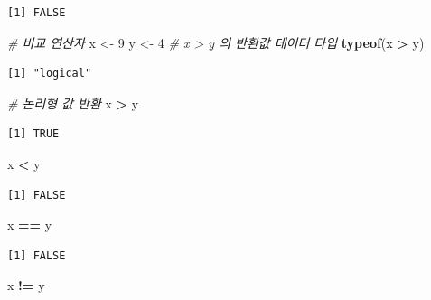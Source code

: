 \documentclass[
  11pt,
]{krantz}
\newenvironment{Shaded}{\begin{snugshade}}{\end{snugshade}}
\newcommand{\CommentTok}[1]{\textcolor[rgb]{0.37,0.37,0.37}{\textit{#1}}}
\newcommand{\DecValTok}[1]{\textcolor[rgb]{0.06,0.06,0.06}{#1}}
\newcommand{\KeywordTok}[1]{\textcolor[rgb]{0.27,0.27,0.27}{\textbf{#1}}}
\newcommand{\NormalTok}[1]{#1}
\newcommand{\OperatorTok}[1]{\textcolor[rgb]{0.43,0.43,0.43}{\textbf{#1}}}
\newcommand{\StringTok}[1]{\textcolor[rgb]{0.5,0.5,0.5}{#1}}
\begin{document}
\begin{verbatim}
[1] FALSE
\end{verbatim}

\begin{Shaded}
\begin{Highlighting}[]
\CommentTok{# 비교 연산자}
\NormalTok{x <-}\StringTok{ }\DecValTok{9}
\NormalTok{y <-}\StringTok{ }\DecValTok{4}
\CommentTok{# x > y 의 반환값 데이터 타입}
\KeywordTok{typeof}\NormalTok{(x }\OperatorTok{>}\StringTok{ }\NormalTok{y)}
\end{Highlighting}
\end{Shaded}

\begin{verbatim}
[1] "logical"
\end{verbatim}

\begin{Shaded}
\begin{Highlighting}[]
\CommentTok{# 논리형 값 반환}
\NormalTok{x }\OperatorTok{>}\StringTok{ }\NormalTok{y}
\end{Highlighting}
\end{Shaded}

\begin{verbatim}
[1] TRUE
\end{verbatim}

\begin{Shaded}
\begin{Highlighting}[]
\NormalTok{x }\OperatorTok{<}\StringTok{ }\NormalTok{y}
\end{Highlighting}
\end{Shaded}

\begin{verbatim}
[1] FALSE
\end{verbatim}

\begin{Shaded}
\begin{Highlighting}[]
\NormalTok{x }\OperatorTok{==}\StringTok{ }\NormalTok{y}
\end{Highlighting}
\end{Shaded}

\begin{verbatim}
[1] FALSE
\end{verbatim}

\begin{Shaded}
\begin{Highlighting}[]
\NormalTok{x }\OperatorTok{!=}\StringTok{ }\NormalTok{y}
\end{Highlighting}
\end{Shaded}
\end{document}
